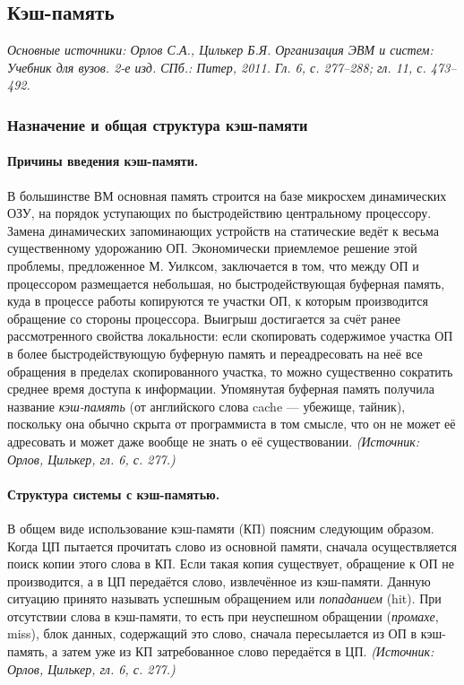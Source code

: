 \documentclass[a4paper,12pt]{article}
\begin{document}
\subsection{Кэш-память}

\noindent\textit{Основные источники: Орлов С.А., Цилькер Б.Я. Организация ЭВМ и систем: Учебник для вузов. 2-е изд. СПб.: Питер, 2011. Гл. 6, с. 277--288; гл. 11, с. 473--492.}

\subsubsection{Назначение и общая структура кэш-памяти}

\paragraph{Причины введения кэш-памяти.}
В большинстве ВМ основная память строится на базе микросхем динамических ОЗУ, на порядок уступающих по быстродействию центральному процессору. Замена динамических запоминающих устройств на статические ведёт к весьма существенному удорожанию ОП. Экономически приемлемое решение этой проблемы, предложенное М. Уилксом, заключается в том, что между ОП и процессором размещается небольшая, но быстродействующая буферная память, куда в процессе работы копируются те участки ОП, к которым производится обращение со стороны процессора. Выигрыш достигается за счёт ранее рассмотренного свойства локальности: если скопировать содержимое участка ОП в более быстродействующую буферную память и переадресовать на неё все обращения в пределах скопированного участка, то можно существенно сократить среднее время доступа к информации. Упомянутая буферная память получила название \emph{кэш-память} (от английского слова cache --- убежище, тайник), поскольку она обычно скрыта от программиста в том смысле, что он не может её адресовать и может даже вообще не знать о её существовании.
\textit{(Источник: Орлов, Цилькер, гл. 6, с. 277.)}

\paragraph{Структура системы с кэш-памятью.}
В общем виде использование кэш-памяти (КП) поясним следующим образом. Когда ЦП пытается прочитать слово из основной памяти, сначала осуществляется поиск копии этого слова в КП. Если такая копия существует, обращение к ОП не производится, а в ЦП передаётся слово, извлечённое из кэш-памяти. Данную ситуацию принято называть успешным обращением или \emph{попаданием} (hit). При отсутствии слова в кэш-памяти, то есть при неуспешном обращении (\emph{промахе}, miss), блок данных, содержащий это слово, сначала пересылается из ОП в кэш-память, а затем уже из КП затребованное слово передаётся в ЦП.
\textit{(Источник: Орлов, Цилькер, гл. 6, с. 277.)}
\end{document}
